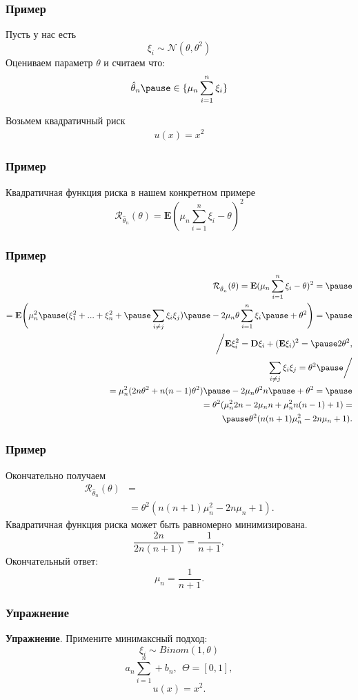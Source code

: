 \begin{frame}
\frametitle{Пример}
Пусть у нас есть
$$
\xi_i \sim \mathcal{N}(\theta, \theta^2)
$$
Оцениваем параметр $\theta$ и считаем что:
$$
\hat{\theta}_n 
\pause
\in \{\mu_n 
\sum_{i=1}^n \xi_i\}
$$

Возьмем квадратичный риск
\begin{eqnarray*}
u(x)=x^2
\end{eqnarray*}
\end{frame}



\begin{frame}
\frametitle{Пример}
Квадратичная функция риска в нашем конкретном примере
$$
 \mathcal{R}_{\hat{\theta}_n}(\theta) =
 \mathrm{\mathbf{E}} (\mu_n \sum_{i=1}^n \xi_i
 - \theta  )^2
$$
\end{frame}

\begin{frame}
\frametitle{Пример}
\begin{eqnarray*}
 \mathcal{R}_{\hat{\theta}_n}(\theta) =
 \mathrm{\mathbf{E}} (\mu_n \sum_{i=1}^n \xi_i
 - \theta  )^2=
 \pause
 \\
 = \mathrm{\mathbf{E}} 
 \Bigg(\mu_n^2
 \pause
 (  \xi_1^2+...+\xi_n^2 +
 \pause
 \sum_{i \neq j} \xi_i \xi_j)
 \pause
 - 2 \mu_n  \theta   \sum_{i=1}^n \xi_i
 \pause
 + \theta^2
 \Bigg) =
 \pause
 \\
 \bigg/
 \mathrm{\mathbf{E}}\xi_i^2= \mathrm{\mathbf{D}}\xi_i+(\mathrm{\mathbf{E}} \xi_i)^2
 =
 \pause
 2 \theta^2,
 \\
 \sum_{i \neq j} \xi_i \xi_j =\theta^2
 \pause
 \bigg/
 \\
 =\mu_n^2 (2n \theta^2+n(n-1)\theta^2) \pause 
 - 2\mu_n \theta^2 n 
 \pause
 + \theta^2=
 \pause
 \\
 =\theta^2(\mu_n^2 2n - 2\mu_n  n +\mu_n^2n(n-1)+ 1)= \\
 \pause
 \theta^2(n(n+1)\mu_n^2 -2n \mu_n   + 1). 
\end{eqnarray*}
\end{frame}

\begin{frame}
\frametitle{Пример}
Окончательно получаем
\begin{align*}
 \mathcal{R}_{\hat{\theta}_n}(\theta) & =
 \\
 & =
 \theta^2(n(n+1)\mu_n^2 -2n \mu_n   + 1). 
\end{align*}
Квадратичная
функция риска может быть  равномерно минимизирована.
\pause
$$
\frac{2n}{2n(n+1)}=\frac{1}{n+1},
$$
Окончательный ответ:
$$
\mu_n=\frac{1}{n+1}.
$$
\end{frame}
%
\begin{frame}
\frametitle{Упражнение}
\textbf{Упражнение}. Примените минимаксный подход:
 $$
 \xi_i \sim Binom(1,\theta)
$$
$$
 a_n\sum_{i=1}^n+b_n, ~~\Theta=[0,1],
 $$
 $$
 u(x)=x^2.
 $$
\end{frame}

